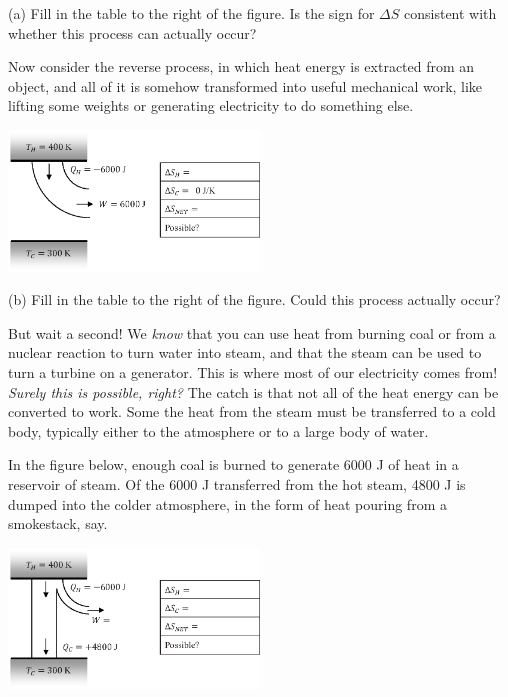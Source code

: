 (a) Fill in the table to the right of the figure.  Is the sign for $\Delta S$ consistent with whether this process can actually occur?
\answerspace{0.6 in}

\pagebreak[3]
Now consider the reverse process, in which heat energy is extracted from an object, and all of it is somehow transformed into useful mechanical work, like lifting some weights or generating electricity to do something else.

\begin{center}
\vspace{-0.2 in}
\includegraphics[width=0.5\textwidth]{entropy_is_it_possible/fig4.eps}
\vspace{-0.2 in}
\end{center}

(b) Fill in the table to the right of the figure.  Could this process actually occur? 
\answerspace{0.2 in}

But wait a second!  We \textit{know} that you can use heat from burning coal or from a nuclear reaction to turn water into steam, and that the steam can be used to turn a turbine on a generator.  This is where most of our electricity comes from!  \textit{Surely this is possible, right?}  The catch is that not all of the heat energy can be converted to work.  Some the heat from the steam must be transferred to a cold body, typically either to the atmosphere or to a large body of water.  

In the figure below, enough coal is burned to generate 6000 J of heat in a reservoir of steam.  Of the 6000 J transferred from the hot steam, 4800 J is dumped into the colder atmosphere, in the form of heat pouring from a smokestack, say.   

\begin{center}
\vspace{-0.3 in}
\includegraphics[width=0.5\textwidth]{entropy_is_it_possible/fig5.eps}
\vspace{-0.3 in}
\end{center}

